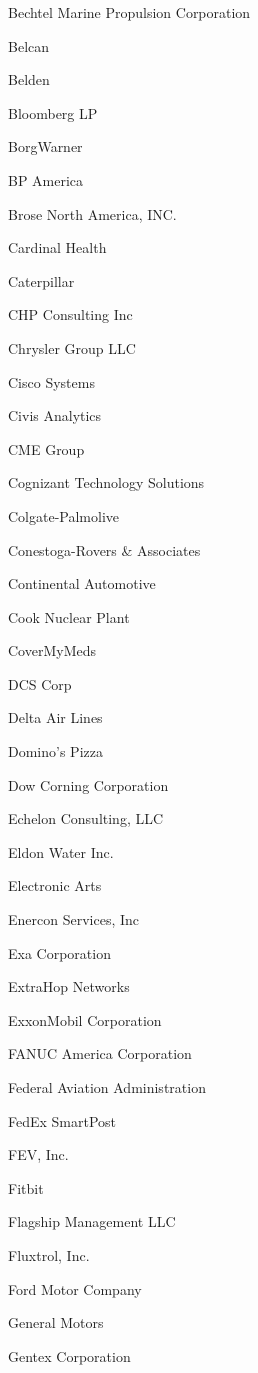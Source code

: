 \documentclass[twoside]{article}
\begin{document}
\begin{center}
\begin{multicols}{5}
\begin{FlushLeft}
\begin{compactitem}
\item Bechtel Marine Propulsion Corporation
\item Belcan
\item Belden
\item Bloomberg LP
\item BorgWarner
\item BP America
\item Brose North America, INC.
\item Cardinal Health
\item Caterpillar
\item CHP Consulting Inc
\item Chrysler Group LLC
\item Cisco Systems
\item Civis Analytics
\item CME Group
\item Cognizant Technology Solutions
\item Colgate-Palmolive
\item Conestoga-Rovers \& Associates
\item Continental Automotive
\item Cook Nuclear Plant
\item CoverMyMeds
\item DCS Corp
\item Delta Air Lines
\item Domino's Pizza
\item Dow Corning Corporation
\item Echelon Consulting, LLC
\item Eldon Water Inc.
\item Electronic Arts
\item Enercon Services, Inc
\item Exa Corporation
\item ExtraHop Networks
\item ExxonMobil Corporation
\item FANUC America Corporation
\item Federal Aviation Administration
\item FedEx SmartPost
\item FEV, Inc.
\item Fitbit
\item Flagship Management LLC
\item Fluxtrol, Inc.
\item Ford Motor Company
\item General Motors
\item Gentex Corporation

\end{compactitem}
\end{FlushLeft}
\end{multicols}
\end{center}
\end{document}

